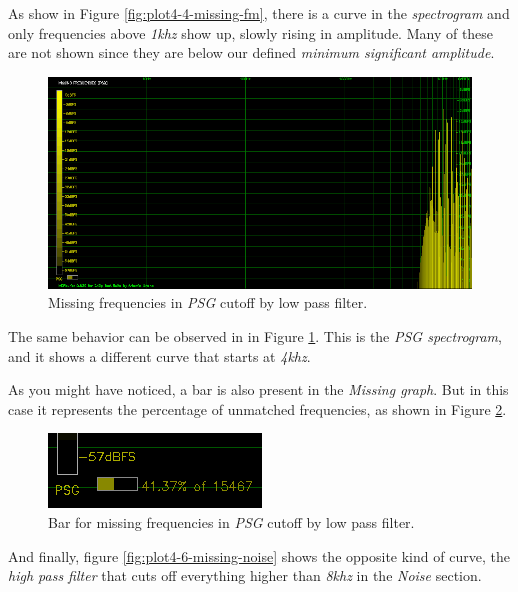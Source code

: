 \documentclass[10pt,a4paper]{report}
\newcommand{\khz}[1]{\textit{#1\acrshort{khz}}}
\begin{document}
As show in Figure \ref{fig:plot4-4-missing-fm}, there is a curve in the \textit{spectrogram} and only frequencies above \khz{1} show up, slowly rising in amplitude. Many of these are not shown since they are below our defined \textit{minimum significant amplitude}.

\begin{figure}[H]
	\centering
	\includegraphics[width=1.0\linewidth]{images/interpretation/Plot4-5-Missing-PSG.png}
	\caption[Missing PSG]{Missing frequencies in \textit{PSG} cutoff by low pass filter.}
	\label{fig:plot4-5-missing-psg}
\end{figure}

The same behavior can be observed in in Figure \ref{fig:plot4-5-missing-psg}. This is the \textit{PSG spectrogram}, and it shows a different curve that starts at \khz{4}. 

As you might have noticed, a bar is also present in the \textit{Missing graph}. But in this case it represents the percentage of unmatched frequencies, as shown in Figure \ref{fig:plot4-5-missing-psg-bars}.

\begin{figure}[H]
	\centering
	\includegraphics[width=0.4\linewidth]{images/interpretation/Plot4-5-Missing-PSG-bar.png}
	\caption[Missing PSG Bar]{Bar for missing frequencies in \textit{PSG} cutoff by low pass filter.}
	\label{fig:plot4-5-missing-psg-bars}
\end{figure}

And finally, figure \ref{fig:plot4-6-missing-noise} shows the opposite kind of curve, the \textit{high pass filter} that cuts off everything higher than \khz{8} in the \textit{Noise} section.
\end{document}
